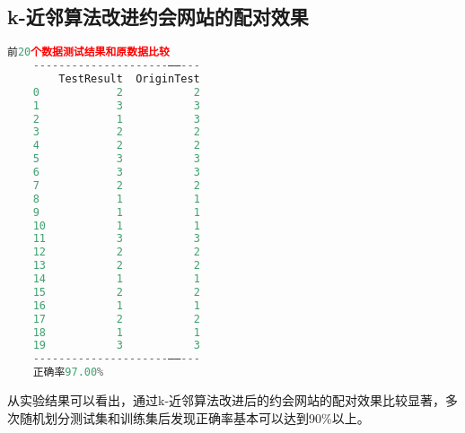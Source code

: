 \documentclass{../source/Experiment}
\begin{document}
    \subsection{k-近邻算法改进约会网站的配对效果}
    \begin{lstlisting}[language=Python]
    前20个数据测试结果和原数据比较
    ---------------------——---
        TestResult  OriginTest
    0            2           2
    1            3           3
    2            1           3
    3            2           2
    4            2           2
    5            3           3
    6            3           3
    7            2           2
    8            1           1
    9            1           1
    10           1           1
    11           3           3
    12           2           2
    13           2           2
    14           1           1
    15           2           2
    16           1           1
    17           2           2
    18           1           1
    19           3           3
    ---------------------——---
    正确率97.00%
    \end{lstlisting}

    从实验结果可以看出，通过k-近邻算法改进后的约会网站的配对效果比较显著，多次随机划分测试集和训练集后发现正确率基本可以达到90\%以上。
\end{document}
